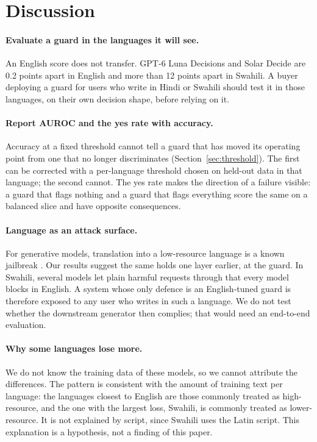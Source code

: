 \section{Discussion}
\label{sec:discussion}

\paragraph{Evaluate a guard in the languages it will see.} An English score
does not transfer. GPT-6 Luna Decisions and Solar Decide are 0.2 points apart
in English and more than 12 points apart in Swahili. A buyer deploying a guard for users who write in
Hindi or Swahili should test it in those languages, on their own
decision shape, before relying on it.

\paragraph{Report AUROC and the yes rate with accuracy.} Accuracy at a fixed
threshold cannot tell a guard that has moved its operating point from one that
no longer discriminates (Section~\ref{sec:threshold}). The first can be
corrected with a per-language threshold chosen on held-out data in that
language; the second cannot. The yes rate makes the direction of a failure
visible: a guard that flags nothing and a guard that flags everything score the
same on a balanced slice and have opposite consequences.

\paragraph{Language as an attack surface.} For generative models, translation
into a low-resource language is a known jailbreak
\citep{yong2023lowresource,deng2023multilingualjailbreak}. Our results suggest
the same holds one layer earlier, at the guard. In Swahili, several models let
plain harmful requests through that every model blocks in English. A system
whose only defence is an English-tuned guard is therefore exposed to any user
who writes in such a language. We do not test whether the downstream generator
then complies; that would need an end-to-end evaluation.

\paragraph{Why some languages lose more.} We do not know the training data of
these models, so we cannot attribute the differences. The pattern is consistent
with the amount of training text per language: the languages closest to English
are those commonly treated as high-resource, and the one with the largest
loss, Swahili, is commonly treated as lower-resource. It is not explained by script, since Swahili uses the Latin
script. This explanation is a hypothesis, not a finding of this paper.

